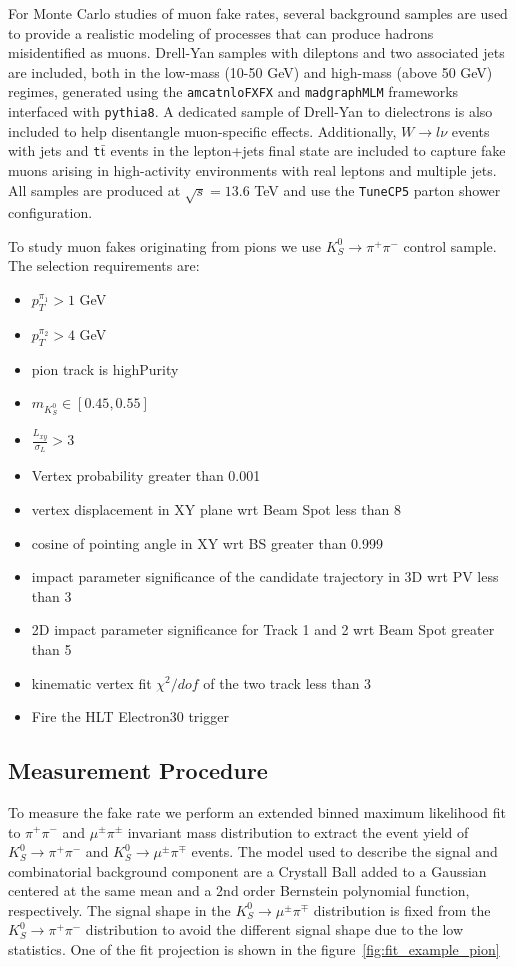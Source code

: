 For Monte Carlo studies of muon fake rates, several background samples are used to provide a realistic modeling of processes that can produce hadrons misidentified as muons. Drell-Yan samples with dileptons and two associated jets are included, both in the low-mass (10-50 GeV) and high-mass (above 50 GeV) regimes, generated using the \texttt{amcatnloFXFX} and \texttt{madgraphMLM} frameworks interfaced with \texttt{pythia8}. A dedicated sample of Drell-Yan to dielectrons is also included to help disentangle muon-specific effects. Additionally, \texttt{$W\to l \nu$} events with jets and \texttt{t$\bar{\text{t}}$} events in the lepton+jets final state are included to capture fake muons arising in high-activity environments with real leptons and multiple jets. All samples are produced at $\sqrt{s} = 13.6$ TeV and use the \texttt{TuneCP5} parton shower configuration.

To study muon fakes originating from pions we use $K_S^0 \to \pi^+ \pi^-$ control sample. The selection requirements are:
\begin{itemize}
\item $p_{T}^{\pi_1}>1$ GeV
\item $p_{T}^{\pi_2}>4$ GeV
\item pion track is highPurity
\item $m_{K_S^0}\in[0.45,0.55]$
\item $\frac{L_{xy}}{\sigma_L}>3$
\item Vertex probability greater than 0.001
\item vertex displacement in XY plane wrt Beam Spot less than 8
\item cosine of pointing angle in XY wrt BS greater than 0.999
\item impact parameter significance of the candidate trajectory in 3D wrt PV less than 3
\item 2D impact parameter significance for Track 1 and 2 wrt Beam Spot greater than 5
\item kinematic vertex fit $\chi^{2}/dof$ of the two track less than 3
\item Fire the HLT Electron30 trigger
\end{itemize}


\subsection{Measurement Procedure}

To measure the fake rate we perform an extended binned maximum likelihood fit to
$\pi^{+}\pi^{-}$ and $\mu^{\pm}\pi^{\pm}$ invariant mass distribution to extract
the event yield of $K_S^0 \to \pi^+ \pi^-$ and $K_S^0 \to \mu^\pm \pi^\mp$ events. The model used to describe the signal and combinatorial background component are a Crystall Ball added to a  Gaussian centered at the same mean and a 2nd order Bernstein polynomial function, respectively. The signal shape in the $K_S^0 \to \mu^\pm \pi^\mp$ distribution is fixed from the $K_S^0 \to \pi^+ \pi^-$  distribution to avoid the different signal shape due to the low statistics. One of the fit projection is shown in the figure~\ref{fig:fit_example_pion}

